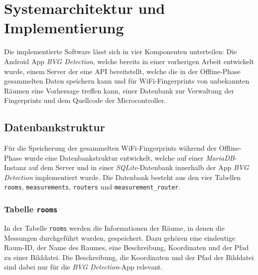 \chapter{Systemarchitektur und Implementierung} \label{implementierung}

Die implementierte Software lässt sich in vier Komponenten unterteilen: Die Android App \textit{BVG Detection}, welche bereits in einer vorherigen Arbeit entwickelt wurde, einem Server der eine API bereitstellt, welche die in der Offline-Phase gesammelten Daten speichern kann und für WiFi-Fingerprints von unbekannten Räumen eine Vorhersage treffen kann, einer Datenbank zur Verwaltung der Fingerprints und dem Quellcode der Microcontroller.

\section{Datenbankstruktur} \label{datenbank}

Für die Speicherung der gesammelten WiFi-Fingerprints während der Offline-Phase wurde eine Datenbankstruktur entwickelt, welche auf einer \textit{MariaDB}-Instanz auf dem Server und in einer \textit{SQLite}-Datenbank innerhalb der App \textit{BVG Detection} implementiert wurde. Die Datenbank besteht aus den vier Tabellen \texttt{rooms}, \texttt{measurements}, \texttt{routers} und \texttt{measurement\_router}.

\subsection{Tabelle \texttt{rooms}}

In der Tabelle \texttt{rooms} werden die Informationen der Räume, in denen die Messungen durchgeführt wurden, gespeichert. Dazu gehören eine eindeutige Raum-ID, der Name des Raumes, eine Beschreibung,  Koordinaten und der Pfad zu einer Bilddatei. Die Beschreibung, die Koordinaten und der Pfad der Bilddatei sind dabei nur für die \textit{BVG Detection}-App relevant.

